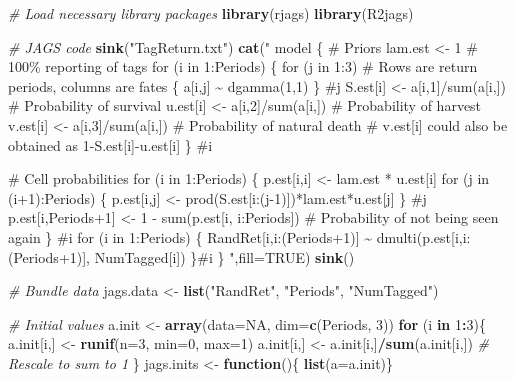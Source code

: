 \documentclass[
]{krantz}
\makeatletter
\newenvironment{Shaded}{\begin{snugshade}}{\end{snugshade}}
\newcommand{\AttributeTok}[1]{\textcolor[rgb]{0.27,0.27,0.27}{#1}}
\newcommand{\CommentTok}[1]{\textcolor[rgb]{0.37,0.37,0.37}{\textit{#1}}}
\newcommand{\ConstantTok}[1]{\textcolor[rgb]{0.37,0.37,0.37}{#1}}
\newcommand{\ControlFlowTok}[1]{\textcolor[rgb]{0.27,0.27,0.27}{\textbf{#1}}}
\newcommand{\DecValTok}[1]{\textcolor[rgb]{0.06,0.06,0.06}{#1}}
\newcommand{\FunctionTok}[1]{\textcolor[rgb]{0.27,0.27,0.27}{\textbf{#1}}}
\newcommand{\NormalTok}[1]{#1}
\newcommand{\OtherTok}[1]{\textcolor[rgb]{0.37,0.37,0.37}{#1}}
\newcommand{\SpecialCharTok}[1]{\textcolor[rgb]{0.43,0.43,0.43}{\textbf{#1}}}
\newcommand{\StringTok}[1]{\textcolor[rgb]{0.5,0.5,0.5}{#1}}
\newenvironment{kframe}{%
\medskip{}
\setlength{\fboxsep}{.8em}
 \def\at@end@of@kframe{}%
 \ifinner\ifhmode%
  \def\at@end@of@kframe{\end{minipage}}%
  \begin{minipage}{\columnwidth}%
 \fi\fi%
 \def\FrameCommand##1{\hskip\@totalleftmargin \hskip-\fboxsep
 \colorbox{shadecolor}{##1}\hskip-\fboxsep
     \hskip-\linewidth \hskip-\@totalleftmargin \hskip\columnwidth}%
 \MakeFramed {\advance\hsize-\width
   \@totalleftmargin\z@ \linewidth\hsize
   \@setminipage}}%
 {\par\unskip\endMakeFramed%
 \at@end@of@kframe}
\renewenvironment{Shaded}{\begin{kframe}}{\end{kframe}}
\makeatother
\begin{document}
\begin{Shaded}
\begin{Highlighting}[]
\CommentTok{\# Load necessary library packages}
\FunctionTok{library}\NormalTok{(rjags)}
\FunctionTok{library}\NormalTok{(R2jags)}

  \CommentTok{\# JAGS code}
  \FunctionTok{sink}\NormalTok{(}\StringTok{"TagReturn.txt"}\NormalTok{)}
  \FunctionTok{cat}\NormalTok{(}\StringTok{"}
\StringTok{  model \{}
\StringTok{  \# Priors}
\StringTok{  lam.est \textless{}{-} 1 \#  100\% reporting of tags}
\StringTok{  for (i in 1:Periods) \{}
\StringTok{     for (j in 1:3) \# Rows are return periods, columns are fates}
\StringTok{       \{}
\StringTok{         a[i,j] \textasciitilde{} dgamma(1,1)}
\StringTok{       \} \#j}
\StringTok{     S.est[i] \textless{}{-} a[i,1]/sum(a[i,]) \# Probability of survival}
\StringTok{     u.est[i] \textless{}{-} a[i,2]/sum(a[i,]) \# Probability of harvest}
\StringTok{     v.est[i] \textless{}{-} a[i,3]/sum(a[i,]) \# Probability of natural death}
\StringTok{     \# v.est[i] could also be obtained as 1{-}S.est[i]{-}u.est[i]}
\StringTok{  \} \#i}

\StringTok{\# Cell probabilities}
\StringTok{  for (i in 1:Periods) \{}
\StringTok{    p.est[i,i] \textless{}{-} lam.est * u.est[i]}
\StringTok{    for (j in (i+1):Periods) \{}
\StringTok{      p.est[i,j] \textless{}{-} prod(S.est[i:(j{-}1)])*lam.est*u.est[j]}
\StringTok{      \} \#j}
\StringTok{    p.est[i,Periods+1] \textless{}{-} 1 {-} sum(p.est[i, i:Periods])}
\StringTok{    \# Probability of not being seen again}
\StringTok{    \} \#i}
\StringTok{  for (i in 1:Periods) \{}
\StringTok{  RandRet[i,i:(Periods+1)] \textasciitilde{} dmulti(p.est[i,i:(Periods+1)], }
\StringTok{                                    NumTagged[i])}
\StringTok{  \}\#i}
\StringTok{ \}}
\StringTok{  "}\NormalTok{,}\AttributeTok{fill=}\ConstantTok{TRUE}\NormalTok{)}
  \FunctionTok{sink}\NormalTok{()}

\CommentTok{\# Bundle data}
\NormalTok{  jags.data }\OtherTok{\textless{}{-}} \FunctionTok{list}\NormalTok{(}\StringTok{"RandRet"}\NormalTok{, }\StringTok{"Periods"}\NormalTok{, }\StringTok{"NumTagged"}\NormalTok{)}

\CommentTok{\# Initial values}
\NormalTok{  a.init }\OtherTok{\textless{}{-}} \FunctionTok{array}\NormalTok{(}\AttributeTok{data=}\ConstantTok{NA}\NormalTok{, }\AttributeTok{dim=}\FunctionTok{c}\NormalTok{(Periods, }\DecValTok{3}\NormalTok{))}
  \ControlFlowTok{for}\NormalTok{ (i }\ControlFlowTok{in} \DecValTok{1}\SpecialCharTok{:}\DecValTok{3}\NormalTok{)\{}
\NormalTok{    a.init[i,] }\OtherTok{\textless{}{-}} \FunctionTok{runif}\NormalTok{(}\AttributeTok{n=}\DecValTok{3}\NormalTok{, }\AttributeTok{min=}\DecValTok{0}\NormalTok{, }\AttributeTok{max=}\DecValTok{1}\NormalTok{)}
\NormalTok{    a.init[i,] }\OtherTok{\textless{}{-}}\NormalTok{ a.init[i,]}\SpecialCharTok{/}\FunctionTok{sum}\NormalTok{(a.init[i,]) }\CommentTok{\# Rescale to sum to 1}
\NormalTok{  \}}
\NormalTok{  jags.inits }\OtherTok{\textless{}{-}} \ControlFlowTok{function}\NormalTok{()\{ }\FunctionTok{list}\NormalTok{(}\AttributeTok{a=}\NormalTok{a.init)\}}


\end{Highlighting}
\end{Shaded}
\end{document}
